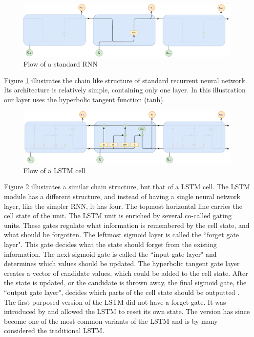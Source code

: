 \begin{figure}[ht]
    \centering
    \includegraphics[width=1\textwidth]{fig/related_work/rnn_flow.pdf}
    \caption{Flow of a standard RNN}
    \label{fig:nn-rnn-flow}
\end{figure}

Figure \ref{fig:nn-rnn-flow} illustrates the chain like structure of standard recurrent neural network. Its architecture is relatively simple, containing only one layer. In this illustration our layer uses the hyperbolic tangent function (tanh).

\begin{figure}[ht]
    \centering
    \includegraphics[width=1\textwidth]{fig/related_work/lstm_flow.pdf}
    \caption{Flow of a LSTM cell}
    \label{fig:nn-lstm-flow}
\end{figure}

Figure \ref{fig:nn-lstm-flow} illustrates a similar chain structure, but that of a LSTM cell. The LSTM module has a different structure, and instead of having a single neural network layer, like the simpler RNN, it has four. The topmost horizontal line carries the cell state of the unit. The LSTM unit is enriched by several co-called gating units. These gates regulate what information is remembered by the cell state, and what should be forgotten. The leftmost sigmoid layer is called the ``forget gate layer". This gate decides what the state should forget from the existing information. The next sigmoid gate is called the ``input gate layer" and determines which values should be updated. The hyperbolic tangent gate layer creates a vector of candidate values, which could be added to the cell state. After the state is updated, or the candidate is thrown away, the final sigmoid gate, the ``output gate layer", decides which parts of the cell state should be outputted \citep{hochreiter1997long, goodfellow2016deeplearning, olah2015lstm, gers2002learning}. The first purposed version of the LSTM did not have a forget gate. It was introduced by \citep{gers2000learning} and allowed the LSTM to reset its own state. The version has since become one of the most common variants of the LSTM and is by many considered the traditional LSTM.

